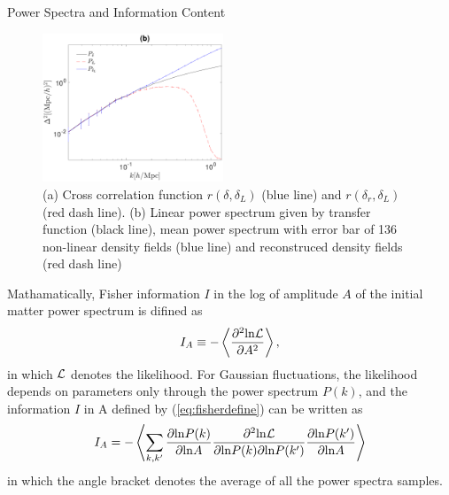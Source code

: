 \begin{section}{Power Spectra and Information Content}
\begin{figure}
\includegraphics[width=0.48\textwidth]{power_analysis-crop.pdf}
\caption{(a) Cross correlation function $r(\delta,\delta_L)$ (blue line) and $r(\delta_r,\delta_L)$ (red dash line). 
(b) Linear power spectrum given by transfer function (black line), mean power spectrum with error bar of
136 non-linear density fields (blue line) and reconstruced density fields (red dash line)}
\label{fig:cross-correlation-power}
\end{figure}

   Mathamatically, Fisher information \cite{bib:Tegmark1997} $I$ in the log of amplitude $A$ of the initial 
matter power spectrum is difined as 
\begin{align}
   I_A \equiv -\left\langle \frac{\partial ^2 \mathrm{ln \mathcal{L}}}{\partial A ^2}\right\rangle,
\label{eq:fisherdefine}
\end{align}
   in which $\mathcal{L}$ denotes the likelihood. For Gaussian fluctuations, the likelihood depends on
parameters only through the power spectrum $P(k)$, and the information $I$ in A defined by (\ref{eq:fisherdefine})
can be written as \cite{bib:Rimes2006}
\begin{align}
    I_A = - \left\langle \sum_{k,k'} \frac{\partial \mathrm{ln} P(k)}{\partial \mathrm{ln} A} 
\frac{\partial ^2 \mathrm{ln \mathcal{L}}}{\partial \mathrm{ln} P(k) \partial \mathrm{ln} P(k')}
\frac{\partial \mathrm{ln} P(k')}{\partial \mathrm{ln} A}\right\rangle
\label{eq:fisherdefineforgaussian}
\end{align}
in which the angle bracket denotes the average of all the power spectra samples.


\end{section}
